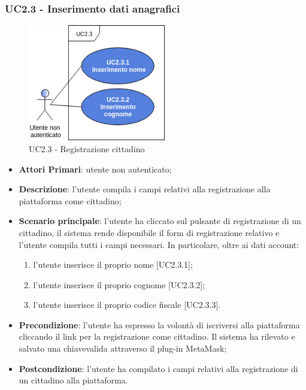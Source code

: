 \subsubsection{UC2.3 - Inserimento dati anagrafici}
\begin{figure}[h]
	\includegraphics[width=6cm]{res/images/UC2-3Registrazione-cliente.png}
	\centering
	\caption{UC2.3 - Registrazione cittadino}
\end{figure}
\begin{itemize}
	\item \textbf{Attori Primari}: utente non autenticato;
	\item \textbf{Descrizione}: l'utente compila i campi relativi alla registrazione alla piattaforma come cittadino;
	\item \textbf{Scenario principale}: l'utente ha cliccato sul pulsante di registrazione di un cittadino, il sistema rende disponibile il form di registrazione relativo e l'utente compila tutti i campi necessari. In particolare, oltre ai dati account:
	\begin{enumerate}[label=\alph*.]
		\item l'utente inserisce il proprio nome [UC2.3.1];
		\item l'utente inserisce il proprio cognome [UC2.3.2];
		\item l'utente inserisce il proprio codice fiscale [UC2.3.3].
	\end{enumerate}
	\item \textbf{Precondizione}: l'utente ha espresso la volontà di iscriversi alla piattaforma cliccando il link per la registrazione come cittadino. Il sistema ha rilevato e salvato una chiave\glosp valida attraverso il plug-in MetaMask\glo;
	\item \textbf{Postcondizione}: l'utente ha compilato i campi relativi alla registrazione di un cittadino alla piattaforma.
\end{itemize}

